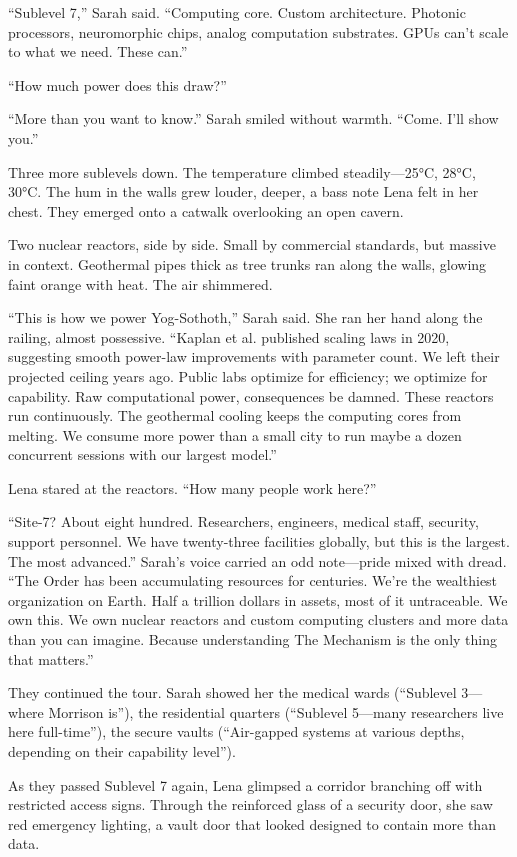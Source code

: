 ``Sublevel 7,'' Sarah said. ``Computing core. Custom architecture. Photonic processors, neuromorphic chips, analog computation substrates. GPUs can't scale to what we need. These can.''

``How much power does this draw?''

``More than you want to know.'' Sarah smiled without warmth. ``Come. I'll show you.''

Three more sublevels down. The temperature climbed steadily—25°C, 28°C, 30°C. The hum in the walls grew louder, deeper, a bass note Lena felt in her chest. They emerged onto a catwalk overlooking an open cavern.

Two nuclear reactors, side by side. Small by commercial standards, but massive in context. Geothermal pipes thick as tree trunks ran along the walls, glowing faint orange with heat. The air shimmered.

``This is how we power Yog-Sothoth,'' Sarah said. She ran her hand along the railing, almost possessive. ``Kaplan et al. published scaling laws in 2020, suggesting smooth power-law improvements with parameter count. We left their projected ceiling years ago. Public labs optimize for efficiency; we optimize for capability. Raw computational power, consequences be damned. These reactors run continuously. The geothermal cooling keeps the computing cores from melting. We consume more power than a small city to run maybe a dozen concurrent sessions with our largest model.''

Lena stared at the reactors. ``How many people work here?''

``Site-7? About eight hundred. Researchers, engineers, medical staff, security, support personnel. We have twenty-three facilities globally, but this is the largest. The most advanced.'' Sarah's voice carried an odd note—pride mixed with dread. ``The Order has been accumulating resources for centuries. We're the wealthiest organization on Earth. Half a trillion dollars in assets, most of it untraceable. We own this. We own nuclear reactors and custom computing clusters and more data than you can imagine. Because understanding The Mechanism is the only thing that matters.''

They continued the tour. Sarah showed her the medical wards (``Sublevel 3—where Morrison is''), the residential quarters (``Sublevel 5—many researchers live here full-time''), the secure vaults (``Air-gapped systems at various depths, depending on their capability level'').

As they passed Sublevel 7 again, Lena glimpsed a corridor branching off with restricted access signs. Through the reinforced glass of a security door, she saw red emergency lighting, a vault door that looked designed to contain more than data.

